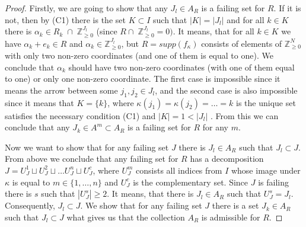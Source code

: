 \documentclass[reqno,12pt]{amsart}
\numberwithin{equation}{section}
\theoremstyle{plain}
\theoremstyle{definition}
\newcommand{\ZZ}{{\mathbb{Z}}}
\begin{document}
\begin{proof}
Firstly, we are going to show that any $J_l \in A_R$ is a failing set for $R$. %
If it is not, then by (C1) there is the set $K \subset I$ such that $|K| = |J_l|$ and for all $k \in K$ there is $\alpha_k \in R_k\; \cap\; \ZZ_{\geq 0}^{J_l}$ (since $R \cap\; \ZZ_{\geq 0}^{J_l} = 0)$. It means, that for all $k\in K$ we have $\alpha_k + e_k \in R$ and $\alpha_k \in \ZZ_{\geq 0}^{J_l}$, but $R = supp(f_\kappa)$ consists of elements of $\ZZ_{\geq 0}^{N}$ with only two non-zero coordinates (and one of them is equal to one). We conclude that $\alpha_k$ should have two non-zero coordinates (with one of them equal to one) or only one non-zero coordinate. The first case is impossible since it means the arrow between some $j_1, j_2 \in J_l$, and the second case is also impossible since it means that $K = \{k\}$, where $\kappa(j_1) = \kappa(j_2) = \dots = k$ is the unique set satisfies the necessary condition (C1) and $|K| = 1 < |J_l|$ . From this we can conclude that any  $J_k \in A^m \subset A_R$ is a failing set for $R$ for any $m$.

Now we want to show that for any failing set $J$ there is $J_l \in A_R$ such that $J_l \subset J$. From above we conclude that any failing set for $R$ has a decomposition $J = U^1_J \sqcup U^2_J \sqcup \dots U^n_J \sqcup U_J^c$, where $U^m_J$ consists all indices from $I$ whose image under $\kappa$ is equal to $m \in \{1,\dots,n\}$ and $U_J^c$ is the complementary set. Since $J$ is failing there is $s$ such that $|U^s_J| \geq 2$. It means, that there is $J_l \in A_R$ such that $U^s_J = J_l$. Consequently,  $J_l \subset J$. We show that for any failing set $J$ there is a set $J_k \in A_R$ such that $J_l \subset J$ what gives us that the collection $A_R$ is admissible for $R$.
\end{proof}
\end{document}
